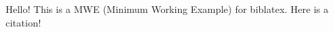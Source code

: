 \documentclass{article}
\begin{document}
Hello! This is a MWE (Minimum Working Example) for biblatex. Here is a citation! \cite{mw_cirtan}
\printbibliography
\end{document}
